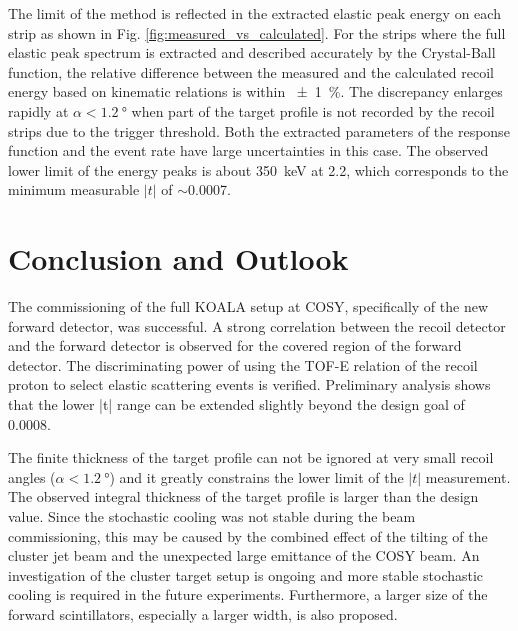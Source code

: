\documentclass[number,5p]{elsarticle}
\begin{document}
The limit of the method is reflected in the extracted elastic peak energy on each strip as shown in
Fig. \ref{fig:measured_vs_calculated}.
For the strips where the full elastic peak spectrum is extracted and described accurately
by the Crystal-Ball function, the relative difference between the measured and
the calculated recoil energy based on kinematic relations is within \SI{\pm 1}{\percent}.
The discrepancy enlarges rapidly at $\alpha < \SI{1.2}{\degree}$ when part of
the target profile is not recorded by the recoil strips due to the trigger threshold.
Both the extracted parameters of the response function and the event rate have large uncertainties in this case.
The observed lower limit of the energy peaks is about \SI{350}{\keV} at \SI{2.2}{\momentum}, which corresponds to the minimum measurable $|t|$ of $\sim$\SI{0.0007}{\tmom}.

\section{Conclusion and Outlook}
\label{sec:conclusion}

The commissioning of the full KOALA setup at COSY, specifically of the new forward detector, was successful.
A strong correlation between the recoil detector and the forward detector is
observed for the covered region of the forward detector.
The discriminating power of using the TOF-E relation of the recoil proton to select elastic
scattering events is verified.
Preliminary analysis shows that the lower |t| range can be extended slightly beyond the design goal of \SI{0.0008}{\tmom}.

The finite thickness of the target profile can not be ignored at
very small recoil angles ($\alpha < \SI{1.2}{\degree}$) and it greatly
constrains the lower limit of the $|t|$ measurement.
The observed integral thickness of the target profile is larger than the design value.
Since the stochastic cooling was not stable during the beam commissioning, this may be caused by the combined effect of the tilting of the cluster jet
beam and the unexpected large emittance of the COSY beam.
An investigation of the cluster target setup is ongoing and more stable stochastic cooling is required in the future experiments.
Furthermore, a larger size of the forward scintillators, especially a larger width, is also proposed.
\end{document}
